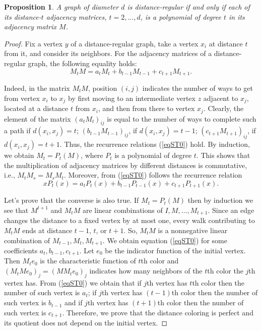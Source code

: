 \documentclass[11pt]{article}
\newtheorem{claim}{Proposition}[section]
\theoremstyle{definition}
\begin{document}
\begin{claim}\label{remDR}
A graph of diameter $d$ is distance-regular if and only if
each of its distance-$t$ adjacency matrices,
$t=2,\dots,d$, is a polynomial of degree $t$ in its
adjacency matrix $M$.
\end{claim}
\begin{proof}
Fix a vertex $y$ of a distance-regular graph,
take a vertex $x_i$ at distance $t$ from it, and consider its neighbors.
For the adjacency matrices 
of a distance-regular graph, the following equality holds:
\begin{equation}\label{eqST0}
M_t M= a_tM_t +b_{t-1}M_{t-1}+c_{t+1}M_{t+1}.
\end{equation}

Indeed, in the matrix $M_t M$, position $(i,j)$ indicates the number
of ways to get from vertex $x_i$ to $x_j$ by first moving to an intermediate vertex $z$ adjacent to $x_j$, located at a distance
$t$ from $x_i$, and then from there to vertex $x_j$. Clearly, the element
of the matrix $(a_tM_t)_{ij}$ is equal to the number of ways to complete such a path
if $d(x_i,x_j)=t$; $(b_{t-1}M_{t-1})_{ij}$, if $d(x_i,x_j)=t-1$;
$(c_{t+1}M_{t+1})_{ij}$, if $d(x_i,x_j)=t+1$. Thus, the recurrence relations (\ref{eqST0}) hold.
By
induction, we obtain $M_t=P_t(M)$, where $P_t$ is a polynomial of degree
$t$.  This shows that the multiplication of adjacency matrices by different
distances is commutative, i.e., $M_tM_s=M_sM_t$. Moreover, from (\ref{eqST0}) follows the recurrence relation
\begin{equation}\label{eqST11}
xP_t(x)=a_tP_t(x)+b_{t-1}P_{t-1}(x)+c_{t+1}P_{t+1}(x).
\end{equation}

Let's prove that
the converse is also true.  If $M_t=P_t(M)$ then by induction we see that $M^{t+1}$ and $M_t M$ are  linear combinations of $I, M,\dots, M_{t+1}$. 
Since an edge changes the distance to a fixed vertex by at most one, every walk contributing to $M_tM$ ends at distance $t-1$, $t$, or $t+1$. So,  $M_tM$ is a nonnegative linear combination of $M_{t-1}, M_t, M_{t+1}$. We obtain equation (\ref{eqST0}) for some coefficients $a_t, b_{t-1}, c_{t+1}$.
 Let $e_0$  be the indicator function of the initial vertex.  Then $M_te_0$ is the characteristic function of $t$th color and  $(M_tMe_0)_j=(MM_te_0)_j$ indicates how many neighbors  of  the $t$th color  the $j$th vertex has.    From  (\ref{eqST0})  we obtain that if  $j$th vertex has $t$th color then the number of such vertex is $a_t$; if  $j$th vertex has $(t-1)$th color then the number of such vertex is $b_{t-1}$ and 
 if  $j$th vertex has $(t+1)$th color then the number of such vertex is $c_{t+1}$.  Therefore, we prove that the distance coloring is perfect and its quotient does not depend on the initial vertex.
\end{proof}
\end{document}
